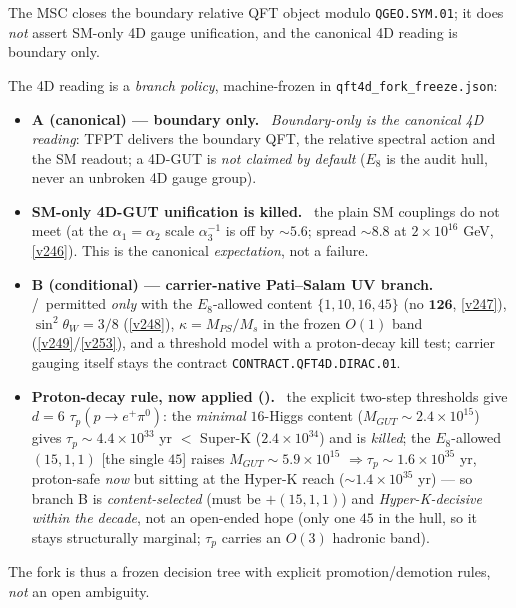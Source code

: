 \documentclass[11pt,a4paper]{article}
\begin{document}
\begin{keybox}
The MSC closes the boundary relative QFT object modulo \texttt{QGEO.SYM.01}; it does \emph{not} assert
SM-only 4D gauge unification, and the canonical 4D reading is boundary only.
\begin{keybox}
The 4D reading is a \emph{branch policy}, machine-frozen in \texttt{qft4d\_fork\_freeze.json}:
\begin{itemize}\setlength\itemsep{1pt}
\item \textbf{A (canonical) --- boundary only.} \mC\ \emph{Boundary-only is the canonical 4D reading}:
  TFPT delivers the boundary QFT, the relative spectral action and the SM readout; a 4D-GUT is
  \emph{not claimed by default} ($E_8$ is the audit hull, never an unbroken 4D gauge group).
\item \textbf{SM-only 4D-GUT unification is killed.} \mX\ the plain SM couplings do not meet (at the
  $\alpha_1{=}\alpha_2$ scale $\alpha_3^{-1}$ is off by ${\sim}5.6$; spread ${\sim}8.8$ at $2{\times}10^{16}$
  GeV, \vref{v246}). This is the canonical \emph{expectation}, not a failure.
\item \textbf{B (conditional) --- carrier-native Pati--Salam UV branch.} \mC/\mO\ permitted \emph{only}
  with the $E_8$-allowed content $\{1,10,16,45\}$ (no $\mathbf{126}$, \vref{v247}), $\sin^2\theta_W{=}3/8$
  (\vref{v248}), $\kappa{=}M_{PS}/M_s$ in the frozen $O(1)$ band (\vref{v249}/\vref{v253}), and a threshold
  model with a proton-decay kill test; carrier gauging itself stays the contract \texttt{CONTRACT.QFT4D.DIRAC.01}.
\item \textbf{Proton-decay rule, now applied ().} \mX\ the explicit
  two-step thresholds give $d{=}6$ $\tau_p(p{\to}e^+\pi^0)$: the \emph{minimal} $16$-Higgs content
  ($M_{GUT}{\sim}2.4{\times}10^{15}$) gives $\tau_p{\sim}4.4{\times}10^{33}$ yr $<$ Super-K
  ($2.4{\times}10^{34}$) and is \emph{killed}; the $E_8$-allowed $(15,1,1)$ [the single $45$] raises
  $M_{GUT}{\sim}5.9{\times}10^{15}$ $\Rightarrow\tau_p{\sim}1.6{\times}10^{35}$ yr, proton-safe \emph{now}
  but sitting at the Hyper-K reach (${\sim}1.4{\times}10^{35}$ yr) --- so branch B is \emph{content-selected}
  (must be $+(15,1,1)$) and \emph{Hyper-K-decisive within the decade}, not an open-ended hope (only one $45$
  in the hull, so it stays structurally marginal; $\tau_p$ carries an $O(3)$ hadronic band).
\end{itemize}
The fork is thus a frozen decision tree with explicit promotion/demotion rules, \emph{not} an open ambiguity.

\end{keybox}
\end{keybox}
\end{document}
